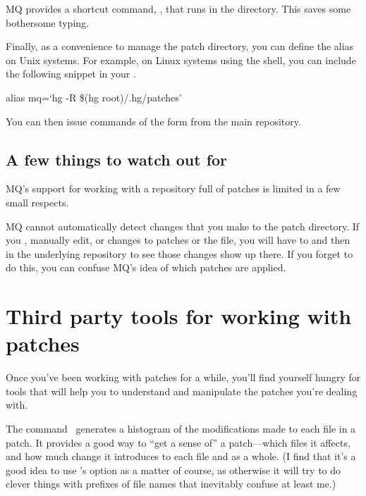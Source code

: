 MQ provides a shortcut command, , that runs
 in the  directory.  This saves
some bothersome typing.

Finally, as a convenience to manage the patch directory, you can
define the alias  on Unix systems. For example, on Linux
systems using the  shell, you can include the following
snippet in your .

\begin{codesample2}
  alias mq=`hg -R \$(hg root)/.hg/patches'
\end{codesample2}

You can then issue commands of the form  from
the main repository.

\subsection{A few things to watch out for}

MQ's support for working with a repository full of patches is limited
in a few small respects.

MQ cannot automatically detect changes that you make to the patch
directory.  If you , manually edit, or 
changes to patches or the  file, you will have to
 and then
 in the underlying repository to
see those changes show up there.  If you forget to do this, you can
confuse MQ's idea of which patches are applied.

\section{Third party tools for working with patches}
\label{sec:mq:tools}

Once you've been working with patches for a while, you'll find
yourself hungry for tools that will help you to understand and
manipulate the patches you're dealing with.

The  command~\cite{web:diffstat} generates a
histogram of the modifications made to each file in a patch.  It
provides a good way to ``get a sense of'' a patch---which files it
affects, and how much change it introduces to each file and as a
whole.  (I find that it's a good idea to use 's
 option as a matter of course, as otherwise it
will try to do clever things with prefixes of file names that
inevitably confuse at least me.)

